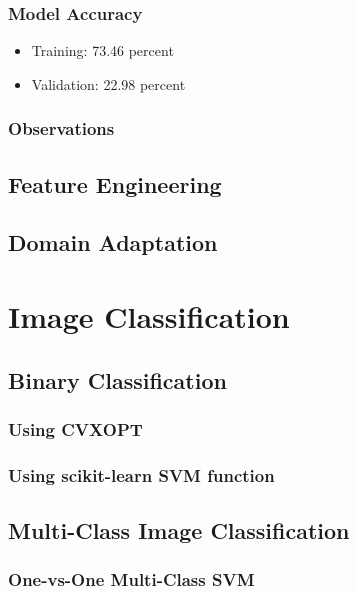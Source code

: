 \documentclass[12pt,a4paper]{article}
\begin{document}
\subsubsection{Model Accuracy}
\begin{itemize}
    \item Training: 73.46 percent
    \item Validation: 22.98 percent
\end{itemize}

\subsubsection{Observations}

\subsection{Feature Engineering}

\subsection{Domain Adaptation}

\section{Image Classification}
\subsection{Binary Classification}
\subsubsection{Using CVXOPT}

\subsubsection{Using scikit-learn SVM function}

\subsection{Multi-Class Image Classification}
\subsubsection{One-vs-One Multi-Class SVM}
\end{document}

